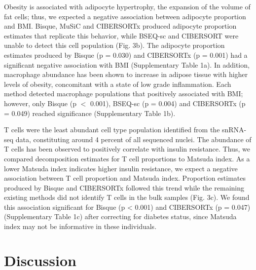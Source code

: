 Obesity is associated with adipocyte hypertrophy, the expansion of the volume of fat cells\cite{Spalding2008-ey}; thus, we expected a negative association between adipocyte proportion and BMI. Bisque, MuSiC and CIBERSORTx produced adipocyte proportion estimates that replicate this behavior, while BSEQ-sc and CIBERSORT were unable to detect this cell population (Fig. 3b). The adipocyte proportion estimates produced by Bisque (p = 0.030) and CIBERSORTx (p = 0.001) had a significant negative association with BMI (Supplementary Table 1a). In addition, macrophage abundance has been shown to increase in adipose tissue with higher levels of obesity, concomitant with a state of low grade inflammation\cite{Weisberg2003-hx}. Each method detected macrophage populations that positively associated with BMI; however, only Bisque (p $<$ 0.001), BSEQ-sc (p = 0.004) and CIBERSORTx (p = 0.049) reached significance (Supplementary Table 1b). 

T cells were the least abundant cell type population identified from the snRNA-seq data, constituting around 4 percent of all sequenced nuclei. The abundance of T cells has been observed to positively correlate with insulin resistance\cite{McLaughlin2014-gn}. Thus, we compared decomposition estimates for T cell proportions to Matsuda index. As a lower Matsuda index indicates higher insulin resistance, we expect a negative association between T cell proportion and Matsuda index. Proportion estimates produced by Bisque and CIBERSORTx followed this trend while the remaining existing methods did not identify T cells in the bulk samples (Fig. 3c). We found this association significant for Bisque (p < 0.001) and CIBERSORTx (p = 0.047) (Supplementary Table 1c) after correcting for diabetes status, since Matsuda index may not be informative in these individuals\cite{Gutch2015-db}. 


\section{Discussion}